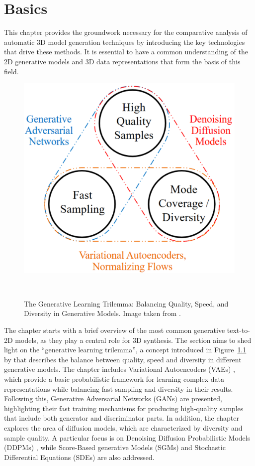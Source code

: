 \chapter{Basics}\label{ch:basics}

This chapter provides the groundwork necessary for the comparative analysis of automatic 3D model generation techniques by introducing the key technologies that drive these methods. It is essential to have a common understanding of the 2D generative models and 3D data representations that form the basis of this field.

\begin{figure}[ht]
  \centering
  \includegraphics[width=.4\columnwidth]{figures/BasicTrilemma.png}
  \caption{The Generative Learning Trilemma: Balancing Quality, Speed, and Diversity in Generative Models. Image taken from \citep{xiao2022tackling}.}~\label{fig:generativeTrilemma}
\end{figure}

The chapter starts with a brief overview of the most common generative text-to-2D models, as they play a central role for 3D synthesis. The section aims to shed light on the ``generative learning trilemma'', a concept introduced in Figure~\ref{fig:generativeTrilemma} by \citeauthor{xiao2022tackling} that describes the balance between quality, speed and diversity in different generative models. The chapter includes Variational Autoencoders (VAEs) \citep{kingmaVAE,rezendeVAE}, which provide a basic probabilistic framework for learning complex data representations while balancing fast sampling and diversity in their results. Following this, Generative Adversarial Networks (GANs) \citep{goodfellowGAN} are presented, highlighting their fast training mechanisms for producing high-quality samples that include both generator and discriminator parts. In addition, the chapter explores the area of diffusion models, which are characterized by diversity and sample quality. A particular focus is on Denoising Diffusion Probabilistic Models (DDPMs) \citep{hoDDPMs,sohlDDPM}, while Score-Based generative Models (SGMs) \citep{song2019SGM} and Stochastic Differential Equations (SDEs) \citep{song2020score,song2021maximum} are also addressed. 

